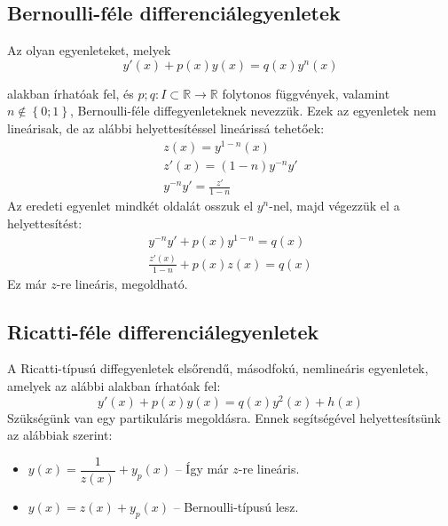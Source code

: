 \documentclass[main.tex]{subfiles}
\begin{document}
\subsection{Bernoulli-féle differenciálegyenletek}

Az olyan egyenleteket, melyek
\begin{equation*}
  y'(x) + p(x)y(x) = q(x)y^n(x)
\end{equation*}

alakban írhatóak fel, és
$p; q : I \subset \mathbb{R} \rightarrow \mathbb{R}$
folytonos függvények, valamint $n \not\in \left\{0; 1\right\}$,
Bernoulli-féle diffegyenleteknek nevezzük. Ezek az egyenletek
nem lineárisak, de az alábbi helyettesítéssel lineárissá tehetőek:
\begin{gather*}
  z(x) = y^{1-n}(x)
  \\
  z'(x) = (1 - n) y^{-n} y'
  \\
  y^{-n} y' = \frac{z'}{1-n}
\end{gather*}
Az eredeti egyenlet mindkét oldalát osszuk el $y^n$-nel,
majd végezzük el a helyettesítést:
\begin{gather*}
  y^{-n} y' + p(x) y^{1 - n} = q(x)
  \\
  \frac{z'(x)}{1 - n} + p(x) z(x) = q(x)
\end{gather*}
Ez már $z$-re lineáris, megoldható.



\subsection{Ricatti-féle differenciálegyenletek}

A Ricatti-típusú diffegyenletek elsőrendű, másodfokú,
nemlineáris egyenletek, amelyek az alábbi alakban
írhatóak fel:
\begin{equation*}
  y'(x) + p(x)y(x) = q(x)y^2(x) + h(x)
\end{equation*}
Szükségünk van egy partikuláris megoldásra.
Ennek segítségével helyettesítsünk az alábbiak szerint:
\begin{itemize}
  \item $y(x) = \dfrac{1}{z(x)} + y_p(x)$
        \tabto{3.9cm} – \tabto{4.4cm}
        Így már $z$-re lineáris.

  \item $y(x) = z(x) + y_p(x)$
        \tabto{3.9cm} – \tabto{4.4cm}
        Bernoulli-típusú lesz.
\end{itemize}
\end{document}
